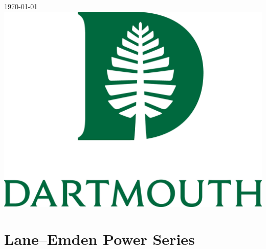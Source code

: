 \begin{titlepage}

\vspace{1cm}
{\large \today}\\[2cm] %

\vspace{4cm}
\includegraphics[scale=0.5]{Graphics/logo.png}\\[1cm] %
 

\vfill %

\end{titlepage}

\section{Lane--Emden Power Series}
